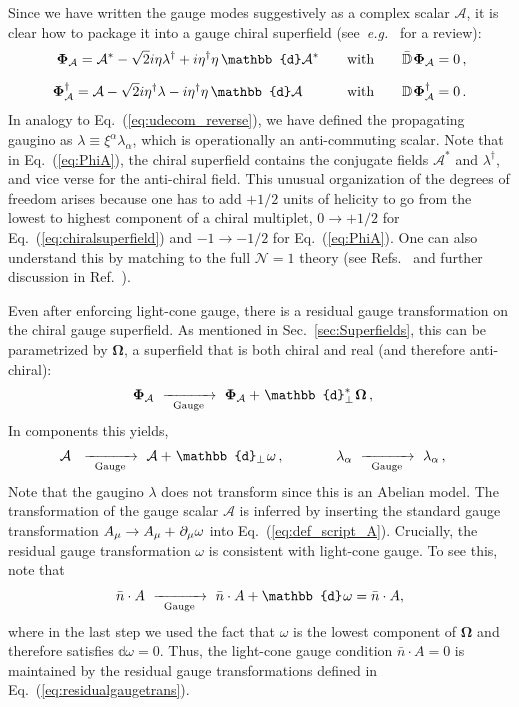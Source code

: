 \documentclass[12pt,document,nofootinbib,superscriptaddress,onecolumn,preprintnumbers,balancelastpage]{article}
\newcommand{\s}{\hspace{0.8pt}}
\newcommand{\PP}{\mathbb{d}}
\newcommand{\gauge}{\,\,\xrightarrow[\hspace{5pt}\text{Gauge}\hspace{5pt}]{}\,\,}
\DeclareRobustCommand{\Sec}[1]{Sec.~\ref{#1}}
\DeclareRobustCommand{\Eq}[1]{Eq.~(\ref{#1})}
\DeclareRobustCommand{\Ref}[1]{Ref.~\cite{#1}}
\DeclareRobustCommand{\Refs}[1]{Refs.~\cite{#1}}
\newcommand{\D}{\mathbb{D}}
\newcommand{\RCA}{\boldsymbol{\Omega}}
\newcommand{\alc}{\mathcal{A}}
\newcommand{\bPhiA}{\bold \Phi_{\alc}}
\begin{document}
\begin{spacing}{1.2}
Since we have written the gauge modes suggestively as a complex scalar $\alc$, it is clear how to package it into a gauge chiral superfield (see~\emph{e.g.}~\cite{Leibbrandt:1987qv} for a review):
%
\begin{align}
\label{eq:PhiA}
\bPhiA =\alc^* - \sqrt{2} i \eta \lambda^\dagger + i \eta^\dagger \eta \, \PP \alc^* \qquad &\text{with} \qquad \bar{\D} \s\bPhiA  = 0 \, , \notag\\[6pt]
\bPhiA^\dagger = \alc - \sqrt{2} i \eta^\dagger \lambda - i \eta^\dagger \eta \, \PP \alc  \hspace{32pt} &\text{with} \qquad \D\s \bPhiA^\dagger  = 0\,.
\end{align}
%
In analogy to \Eq{eq:udecom_reverse}, we have defined the propagating gaugino as $\lambda \equiv \xi^\alpha \lambda_\alpha$, which is operationally an anti-commuting scalar.
%
Note that in \Eq{eq:PhiA}, the chiral superfield contains the conjugate fields $\alc^*$ and $\lambda^\dagger$, and vice verse for the anti-chiral field.
%
This unusual organization of the degrees of freedom arises because one has to add $+1/2$ units of helicity to go from the lowest to highest component of a chiral multiplet, $0 \to +1/2$ for \Eq{eq:chiralsuperfield} and $-1 \to -1/2$ for \Eq{eq:PhiA}.
%
One can also understand this by matching to the full $\mathcal{N} = 1$ theory (see \Refs{Cohen:2016jzp, Cohen:2016dcl} and further discussion in \Ref{Cohen:2019gsc}).


Even after enforcing light-cone gauge, there is a residual gauge transformation on the chiral gauge superfield.
%
As mentioned in \Sec{sec:Superfields}, this can be parametrized by $\RCA$, a superfield that is both chiral and real (and therefore anti-chiral): 
%
\begin{align}
&\bPhiA \gauge \bPhiA + \s\PP_\perp^*\s \RCA \,, 
\label{eq:residualgaugetrans}
\end{align}
%
In components this yields,
%
\begin{align}
&\alc\,\, \gauge \alc +  \s \PP_\perp\s \omega \, , \hspace{27pt} \quad \lambda_\alpha\gauge \lambda_\alpha \,,
\end{align}
Note that the gaugino $\lambda$ does not transform since this is an Abelian model.
%
The transformation of the gauge scalar $\alc$ is inferred by inserting the standard gauge transformation $A_\mu \to A_\mu +  \s \partial_\mu \omega$ into \Eq{eq:def_script_A}.
%
Crucially, the residual gauge transformation $\omega$ is consistent with light-cone gauge.
%
To see this, note that 
\begin{align}
\label{eq:fullloretnzgaugetrans}
 \bar{n} \cdot A \gauge  \bar{n} \cdot A +  \PP \s \omega = \bar{n} \cdot A,
\end{align}
where in the last step we used the fact that $\omega$ is the lowest component of $\RCA$ and therefore satisfies $\PP \omega = 0$.
%
Thus, the light-cone gauge condition $\bar{n} \cdot A = 0$ is maintained by the residual gauge transformations defined in \Eq{eq:residualgaugetrans}.



\end{spacing}
\end{document}
